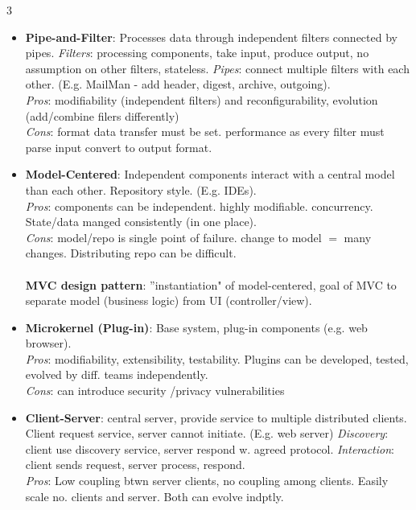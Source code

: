 \documentclass[a4paper, 10pt, landscape]{article}
\begin{document}
\begin{multicols*}{3}
\begin{itemize}
      \item \textbf{Pipe-and-Filter}: Processes data through independent filters connected by pipes. \textit{Filters}: processing components, take input, produce output, no assumption on other filters, stateless. \textit{Pipes}: connect multiple filters with each other. (E.g. MailMan - add header, digest, archive, outgoing). \\
      \textit{Pros}: modifiability (independent filters) and reconfigurability, evolution (add/combine filers differently) \\
      \textit{Cons}: format data transfer must be set. performance as every filter must parse input convert to output format.
      
      \item \textbf{Model-Centered}: Independent components interact with a central model than each other. Repository style. (E.g. IDEs). \\
      \textit{Pros}: components can be independent. highly modifiable. concurrency. State/data manged consistently (in one place).  \\
      \textit{Cons}: model/repo is single point of failure. change to model $=$ many changes. Distributing repo can be difficult. \\  \\
      \textbf{MVC design pattern}: ''instantiation" of model-centered, goal of MVC to separate model (business logic) from UI (controller/view).
      
      \item \textbf{Microkernel (Plug-in)}: Base system, plug-in components (e.g. web browser). \\
      \textit{Pros}: modifiability, extensibility, testability. Plugins can be developed, tested, evolved by diff. teams independently. \\
      \textit{Cons}: can introduce security /privacy vulnerabilities \\
      
      \item \textbf{Client-Server}: central server, provide service to multiple distributed clients. Client request service, server cannot initiate. (E.g. web server) \textit{Discovery}: client use discovery service, server respond w. agreed protocol. \textit{Interaction}: client sends request, server process, respond.   \\
      \textit{Pros}: Low coupling btwn server clients, no coupling among clients. Easily scale no. clients and server. Both can evolve indptly.


\end{itemize}
\end{multicols*}
\end{document}
